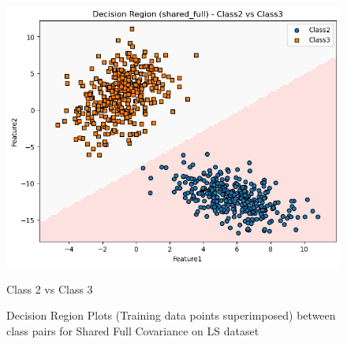 \begin{figure}[H]
\begin{minipage}{0.32\linewidth}
        \includegraphics[width=\linewidth]{images/LS_Group04_images/02_shared_full/04_decision_region_c2_c3.png}
        \caption*{Class 2 vs Class 3}
    \end{minipage}
    \caption{Decision Region Plots (Training data points superimposed) between class pairs for Shared Full Covariance on LS dataset}
\end{figure}